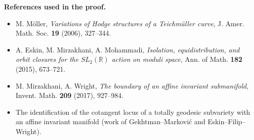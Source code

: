\documentclass[11pt]{article}
\begin{document}
\bigskip

\noindent\textbf{References used in the proof.}
\begin{itemize}
\item M. M\"oller, \emph{Variations of Hodge structures of a Teichm\"uller curve},
J. Amer. Math. Soc. \textbf{19} (2006), 327--344.
\item A. Eskin, M. Mirzakhani, A. Mohammadi,
\emph{Isolation, equidistribution, and orbit closures for the $SL_2(\mathbb R)$ action
on moduli space}, Ann. of Math. \textbf{182} (2015), 673--721.
\item M. Mirzakhani, A. Wright,
\emph{The boundary of an affine invariant submanifold},
Invent. Math. \textbf{209} (2017), 927--984.
\item The identification of the cotangent locus of a totally geodesic subvariety with an
affine invariant manifold (work of Gekhtman--Markovi\'c and Eskin--Filip--Wright).
\end{itemize}
\end{document}

